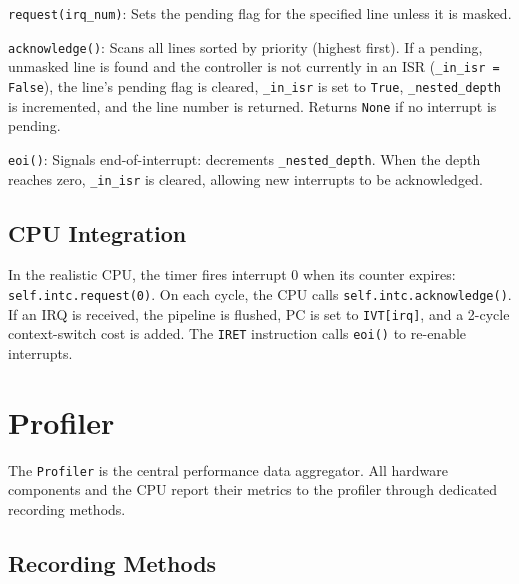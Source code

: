 \documentclass[10pt,a4paper,twoside]{book}
\begin{document}
\noindent\texttt{request(irq\_num)}: Sets the pending flag for the
specified line unless it is masked.

\noindent\texttt{acknowledge()}: Scans all lines sorted by priority
(highest first). If a pending, unmasked line is found and the controller
is not currently in an ISR (\texttt{\_in\_isr = False}), the line's pending
flag is cleared, \texttt{\_in\_isr} is set to \texttt{True},
\texttt{\_nested\_depth} is incremented, and the line number is returned.
Returns \texttt{None} if no interrupt is pending.

\noindent\texttt{eoi()}: Signals end-of-interrupt: decrements
\texttt{\_nested\_depth}. When the depth reaches zero, \texttt{\_in\_isr}
is cleared, allowing new interrupts to be acknowledged.

\subsection{CPU Integration}

In the realistic CPU, the timer fires interrupt 0 when its counter expires:
\texttt{self.intc.request(0)}. On each cycle, the CPU calls
\texttt{self.intc.acknowledge()}. If an IRQ is received, the pipeline is
flushed, PC is set to \texttt{IVT[irq]}, and a 2-cycle context-switch cost
is added. The \texttt{IRET} instruction calls \texttt{eoi()} to re-enable
interrupts.

\section{Profiler}

The \texttt{Profiler} is the central performance data aggregator. All
hardware components and the CPU report their metrics to the profiler through
dedicated recording methods.

\subsection{Recording Methods}
\end{document}
